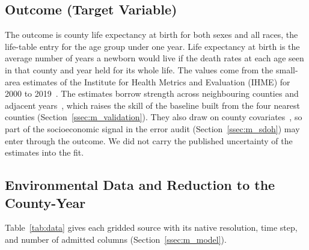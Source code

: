 \documentclass[sensors,article,submit,moreauthors,pdftex]{Definitions/mdpi}
\begin{document}
\subsection{Outcome (Target Variable)}
\label{ssec:m_outcome}
The outcome is county life expectancy at birth for both sexes and all races,
the life-table entry for the age group under one year. Life expectancy at birth
is the average number of years a newborn would live if the death rates at each
age seen in that county and year held for its whole life. The values come from
the small-area estimates of the Institute for Health Metrics and Evaluation
(IHME) for 2000 to 2019~\cite{DwyerLindgren2022}. The estimates borrow
strength across neighbouring counties and adjacent
years~\cite{DwyerLindgren2017}, which raises the skill of the baseline built
from the four nearest counties (Section~\ref{ssec:m_validation}). They also
draw on county
covariates~\cite{DwyerLindgren2017}, so part of the socioeconomic signal in
the error audit (Section~\ref{ssec:m_sdoh}) may enter through the outcome. We
did not carry the published uncertainty of the estimates into the fit.

\subsection{Environmental Data and Reduction to the County-Year}
\label{ssec:m_data}
Table~\ref{tab:data} gives each gridded source with its native resolution, time step, and
number of admitted columns (Section~\ref{ssec:m_model}).
\end{document}
